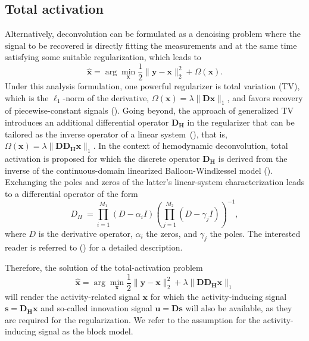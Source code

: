 \subsection{Total activation}
Alternatively, deconvolution can be formulated as a denoising problem where the signal to be recovered is directly fitting the measurements and at the same time satisfying some suitable regularization, which leads to
\begin{equation}
\label{eq:analysis_model}
    \hat{\mathbf{x}} = \arg \min_{\mathbf{x}} \frac{1}{2} \| \mathbf{y} - \mathbf{x} \|_2^2 + \Omega(\mathbf{x}).
\end{equation}
Under this analysis formulation, one powerful regularizer is total variation (TV), which is the $\ell_1$-norm of the derivative, $\Omega(\mathbf{x})=\lambda \|\mathbf{Dx}\|_1$, and favors recovery of piecewise-constant signals (\citealt{Chambolle2004TotalVariation}). Going beyond, the approach of generalized TV introduces an additional differential operator $\mathbf{D_H}$ in the regularizer that can be tailored as the inverse operator of a linear system~(\citealt{Karahanoglu2011SignalProcessingApproach}), that is, $\Omega(\mathbf{x})=\lambda \|\mathbf{D D_H x}\|_1$. In the context of hemodynamic deconvolution, total activation is proposed for which the discrete operator $\mathbf{D_H}$ is derived from the inverse of the continuous-domain linearized Balloon-Windkessel model (\citealt{Buxton1998BalloonModel,Friston2000Nonlinear-Balloon}).  Exchanging the poles and zeros of the latter's linear-system characterization leads to a differential operator of the form 
\begin{equation}
    D_H\ = \prod_{i=1}^{M_1} (D-\alpha_i I) (\prod_{j=1}^{M_2} (D - \gamma_j I))^{-1},
\end{equation}
where \(D\) is the derivative operator, \(\alpha_i\) the zeros, and \(\gamma_j\) the poles. The interested reader is referred to (\citealt{Khalidov2011ActiveletsWaveletssparse,Karahanoglu2013TotalactivationfMRI}) for a detailed description. 

Therefore, the solution of the total-activation problem
\begin{equation}
\label{eq:TA}
    \hat{\mathbf{x}} = \arg \min_{\mathbf{x}} \frac{1}{2} \| \mathbf{y} - \mathbf{x} \|_2^2 + \lambda \| \mathbf{D D_H x} \|_1
\end{equation}
will render the activity-related signal $\mathbf{x}$ for which the activity-inducing signal $\mathbf{s}=\mathbf{D_H x}$ and so-called innovation signal $\mathbf{u}=\mathbf{Ds}$ will also be available, as they are required for the regularization. We refer to the assumption for the activity-inducing signal as the block model.

